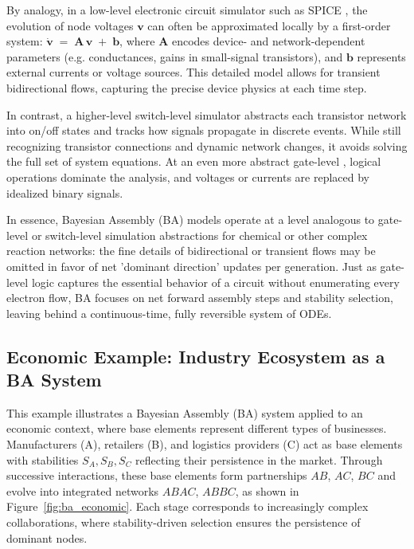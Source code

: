 \documentclass[entropy,article,submit,pdftex,moreauthors]{Definitions/mdpi}
\begin{document}
By analogy, in a low-level electronic circuit simulator such as SPICE \cite{SpiceRef}, the evolution of node voltages $\mathbf{v}$ can often be approximated locally by a first-order system:
$\dot{\mathbf{v}} \;=\; \mathbf{A}\,\mathbf{v} \;+\; \mathbf{b}$,
where $\mathbf{A}$ encodes device- and network-dependent parameters (e.g. conductances, gains in small-signal transistors), and $\mathbf{b}$ represents external currents or voltage sources. This detailed model allows for transient bidirectional flows, capturing the precise device physics at each time step.

In contrast, a higher-level switch-level simulator \cite{AdlerCAD} abstracts each transistor network into on/off states and tracks how signals propagate in discrete events. While still recognizing transistor connections and dynamic network changes, it avoids solving the full set of system equations. At an even more abstract gate-level \cite{FeynmanComp}, logical operations dominate the analysis, and voltages or currents are replaced by idealized binary signals.

In essence, Bayesian Assembly (BA) models operate at a level analogous to gate-level or switch-level simulation abstractions for chemical or other complex reaction networks: the fine details of bidirectional or transient flows may be omitted in favor of net 'dominant direction' updates per generation. Just as gate-level logic captures the essential behavior of a circuit without enumerating every electron flow, BA focuses on net forward assembly steps and stability selection, leaving behind a continuous-time, fully reversible system of ODEs. 

\subsection{Economic Example: Industry Ecosystem as a BA System}

This example illustrates a Bayesian Assembly (BA) system applied to an economic context, where base elements represent different types of businesses. Manufacturers (A), retailers (B), and logistics providers (C) act as base elements with stabilities \( S_A, S_B, S_C \) reflecting their persistence in the market. Through successive interactions, these base elements form partnerships \( AB \), \( AC \), \( BC \) and evolve into integrated networks \( ABAC \), \( ABBC \), as shown in Figure~\ref{fig:ba_economic}. Each stage corresponds to increasingly complex collaborations, where stability-driven selection ensures the persistence of dominant nodes. 
\end{document}
